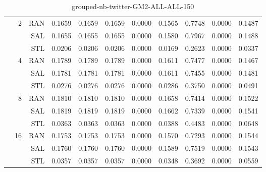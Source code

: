 \begin{center}
\begin{table}[htbp]
\begin{tabular}{ | r | r | r | r | r | r | r | r | r | r | r |}
 & \multirow{3}{*}{2} & RAN & 0.1659 & 0.1659 & 0.1659 & 0.0000 & 0.1565 & 0.7748 & 0.0000 & 0.1487\\ \cline{3-11}
 &   & SAL & 0.1655 & 0.1655 & 0.1655 & 0.0000 & 0.1580 & 0.7967 & 0.0000 & 0.1488\\ \cline{3-11}
 &   & STL & 0.0206 & 0.0206 & 0.0206 & 0.0000 & 0.0169 & 0.2623 & 0.0000 & 0.0337\\ \cline{2-11}
 & \multirow{3}{*}{4} & RAN & 0.1789 & 0.1789 & 0.1789 & 0.0000 & 0.1611 & 0.7477 & 0.0000 & 0.1467\\ \cline{3-11}
 &   & SAL & 0.1781 & 0.1781 & 0.1781 & 0.0000 & 0.1611 & 0.7455 & 0.0000 & 0.1481\\ \cline{3-11}
 &   & STL & 0.0276 & 0.0276 & 0.0276 & 0.0000 & 0.0286 & 0.3750 & 0.0000 & 0.0491\\ \cline{2-11}
 & \multirow{3}{*}{8} & RAN & 0.1810 & 0.1810 & 0.1810 & 0.0000 & 0.1658 & 0.7414 & 0.0000 & 0.1522\\ \cline{3-11}
 &   & SAL & 0.1819 & 0.1819 & 0.1819 & 0.0000 & 0.1662 & 0.7339 & 0.0000 & 0.1541\\ \cline{3-11}
 &   & STL & 0.0363 & 0.0363 & 0.0363 & 0.0000 & 0.0388 & 0.4483 & 0.0000 & 0.0648\\ \cline{2-11}
 & \multirow{3}{*}{16} & RAN & 0.1753 & 0.1753 & 0.1753 & 0.0000 & 0.1570 & 0.7293 & 0.0000 & 0.1544\\ \cline{3-11}
 &   & SAL & 0.1760 & 0.1760 & 0.1760 & 0.0000 & 0.1589 & 0.7519 & 0.0000 & 0.1543\\ \cline{3-11}
 &   & STL & 0.0357 & 0.0357 & 0.0357 & 0.0000 & 0.0348 & 0.3692 & 0.0000 & 0.0559\\ \cline{2-11}
\hline
\end{tabular}
\caption{grouped-nb-twitter-GM2-ALL-ALL-150}
\end{table}
\end{center}

